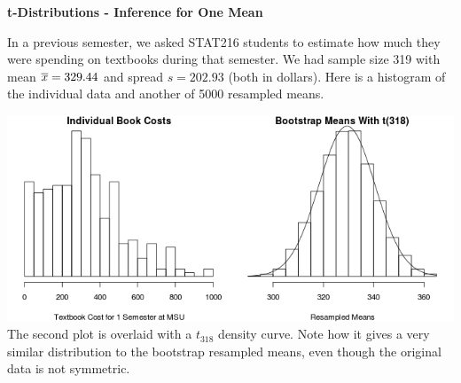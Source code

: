 \def\theTopic{t Procedures for a Single Mean }
\def\dayNum{24 }


\begin{center}
 {\large \textbf{t-Distributions - Inference for One Mean}}
\end{center}


In a previous semester, we asked STAT216 students to estimate how much they were
spending on textbooks during that semester.  We had sample size 319
with mean $\overline{x} = 329.44$ and spread $s = 202.93$ (both in
dollars). Here is a histogram of 
the individual data and another of 5000 resampled means.


\includegraphics[width=\linewidth]{../plots/bookCostDistns.png}
The second plot is overlaid with a $t_{318}$ density curve.  Note how
it gives a very similar distribution to the bootstrap resampled means,
even though the original data is not symmetric.

